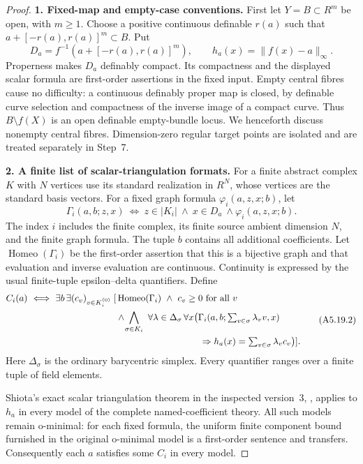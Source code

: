 \begin{proof}
\textbf{1. Fixed-map and empty-case conventions.}\quad
First let $Y=B\subset R^m$ be open, with $m\ge1$. Choose a positive
continuous definable $r(a)$ such that
$a+[-r(a),r(a)]^m\subset B$. Put
\[
 D_a=f^{-1}(a+[-r(a),r(a)]^m),\qquad
 h_a(x)=\|f(x)-a\|_\infty.
 \tag{A5.19.1}
\]
Properness makes $D_a$ definably compact. Its compactness and the displayed
scalar formula are first-order assertions in the fixed input. Empty
central fibres cause no difficulty: a continuous definably proper map is
closed, by definable curve selection and compactness of the inverse image
of a compact curve. Thus $B\setminus f(X)$ is an open definable empty-bundle
locus. We henceforth discuss nonempty central fibres. Dimension-zero
regular target points are isolated and are treated separately in Step~7.

\textbf{2. A finite list of scalar-triangulation formats.}\quad
For a finite abstract complex $K$ with $N$ vertices use its standard
realization in $R^N$, whose vertices are the standard basis vectors.
For a fixed graph formula $\varphi_i(a,z,x;b)$, let
\[
 \Gamma_i(a,b;z,x)\ \Longleftrightarrow\
 z\in|K_i|\ \wedge\ x\in D_a\ \wedge\varphi_i(a,z,x;b).
\]
The index $i$ includes the finite complex, its finite source ambient
dimension $N$, and the finite graph formula. The tuple $b$ contains all
additional coefficients. Let $\operatorname{Homeo}(\Gamma_i)$ be the
first-order assertion that this is a bijective graph and that evaluation
and inverse evaluation are continuous. Continuity is expressed by the
usual finite-tuple epsilon--delta quantifiers. Define
\[
\begin{split}
 C_i(a)\ \Longleftrightarrow\ \exists b\,\exists(c_v)_{v\in K_i^{(0)}}\;
 [&\operatorname{Homeo}(\Gamma_i)\ \wedge\ c_v\ge0\text{ for all }v\\
 &\wedge\!\bigwedge_{\sigma\in K_i}\ \forall\lambda\in\Delta_\sigma\,
 \forall x\bigl(\Gamma_i(a,b;\textstyle\sum_{v\in\sigma}\lambda_vv,x)\\
 &\hspace{32mm}\Rightarrow
 h_a(x)=\textstyle\sum_{v\in\sigma}\lambda_vc_v\bigr)].
\end{split}
\tag{A5.19.2}
\]
Here $\Delta_\sigma$ is the ordinary barycentric simplex. Every quantifier
ranges over a finite tuple of field elements.

Shiota's exact scalar triangulation theorem in the inspected version~3,
\cite[Theorem~2.2(1), printed p.~6]{Shiota2010}, applies to $h_a$ in every model of the complete
named-coefficient theory. All such models remain o-minimal: for each
fixed formula, the uniform finite component bound furnished in the
original o-minimal model is a first-order sentence and transfers.
Consequently each $a$ satisfies some $C_i$ in every model.


\end{proof}
